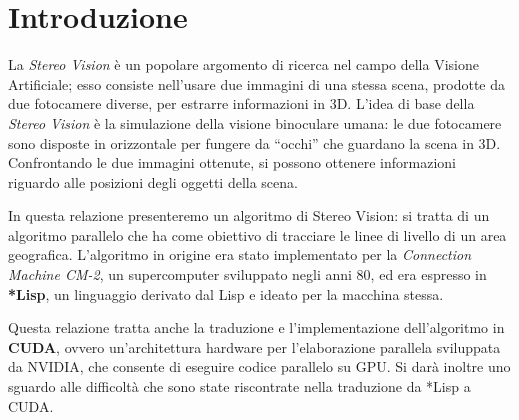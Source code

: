 \documentclass[12pt,a4paper,openright,twoside]{report}
\begin{document}

\tableofcontents
\rhead[\fancyplain{}{\bfseries\leftmark}]{\fancyplain{}{\bfseries\thepage}}
\clearpage{\pagestyle{empty}\cleardoublepage}

\listoffigures
\clearpage{\pagestyle{empty}\cleardoublepage}






\chapter*{Introduzione}



La \textit{Stereo Vision} è un popolare argomento di ricerca nel campo della Visione Artificiale; esso consiste nell'usare due immagini di una stessa scena, prodotte da due fotocamere diverse, per estrarre informazioni in 3D. L'idea di base della \textit{Stereo Vision} è la simulazione della visione binoculare umana: le due fotocamere sono disposte in orizzontale per fungere da ``occhi'' che guardano la scena in 3D. Confrontando le due immagini ottenute, si possono ottenere informazioni riguardo alle posizioni degli oggetti della scena.

In questa relazione presenteremo un algoritmo di Stereo Vision: si tratta di un algoritmo parallelo che ha come obiettivo di tracciare le linee di livello di un area geografica. L'algoritmo in origine era stato implementato per la \textit{Connection Machine CM-2}, un supercomputer sviluppato negli anni 80, ed era espresso in \textbf{*Lisp}, un linguaggio derivato dal Lisp e ideato per la macchina stessa.

Questa relazione tratta anche la traduzione e l'implementazione dell'algoritmo in \textbf{CUDA}, ovvero un'architettura hardware per l'elaborazione parallela sviluppata da NVIDIA, che consente di eseguire codice parallelo su GPU. Si darà inoltre uno sguardo alle difficoltà che sono state riscontrate nella traduzione da *Lisp a CUDA.
\end{document}
